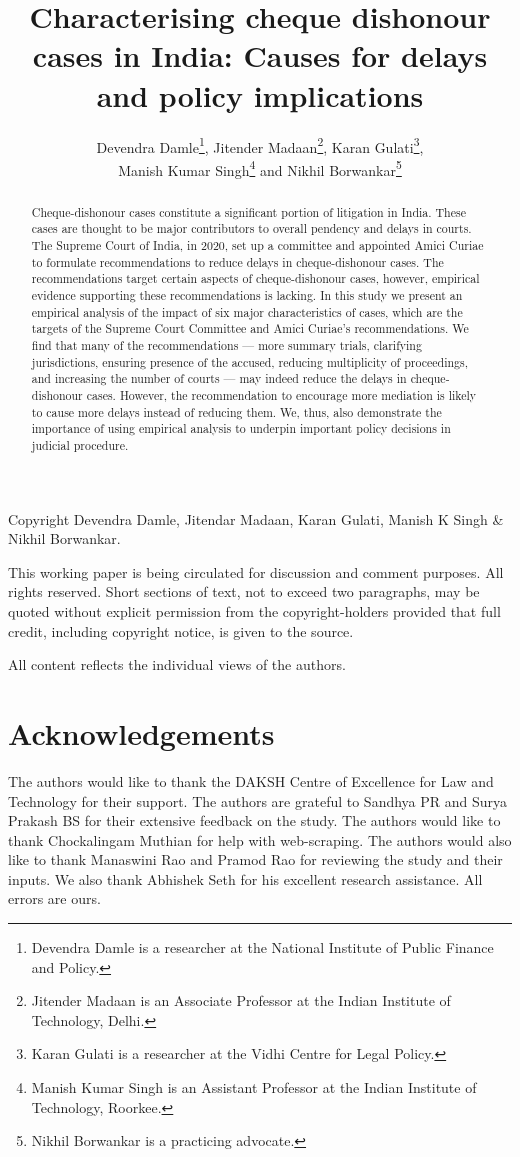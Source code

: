 \documentclass[12pt,a4paper]{article}
\title{Characterising cheque dishonour cases in India: Causes for delays and policy implications}
\author{Devendra Damle\thanks{Devendra Damle is a researcher at the National Institute of Public Finance and Policy.}, Jitender Madaan\thanks{Jitender Madaan is an Associate Professor at the Indian Institute of Technology, Delhi.}, Karan Gulati\thanks{Karan Gulati is a researcher at the Vidhi Centre for Legal Policy.},\\ Manish Kumar Singh\thanks{Manish Kumar Singh is an Assistant Professor at the Indian Institute of Technology, Roorkee.} and Nikhil Borwankar\thanks{Nikhil Borwankar is a practicing advocate.}}
\begin{document}
\maketitle

\begin{abstract}
Cheque-dishonour cases constitute a significant portion of litigation in India. These cases are thought to be major contributors to overall pendency and delays in courts. The Supreme Court of India, in 2020, set up a committee and appointed Amici Curiae to formulate recommendations to reduce delays in cheque-dishonour cases. The recommendations target certain aspects of cheque-dishonour cases, however, empirical evidence supporting these recommendations is lacking. In this study we present an empirical analysis of the impact of six major characteristics of cases, which are the targets of the Supreme Court Committee and Amici Curiae's recommendations. We find that many of the recommendations --- more summary trials, clarifying jurisdictions, ensuring presence of the accused, reducing multiplicity of proceedings, and increasing the number of courts --- may indeed reduce the delays in cheque-dishonour cases. However, the recommendation to encourage more mediation is likely to cause more delays instead of reducing them. We, thus, also demonstrate the importance of using empirical analysis to underpin important policy decisions in judicial procedure.
\end{abstract}

\newpage

Copyright Devendra Damle, Jitendar Madaan, Karan Gulati, Manish K Singh \& Nikhil Borwankar.

This working paper is being circulated for discussion and comment purposes. All rights reserved. Short sections of text, not to exceed two paragraphs, may be quoted without explicit permission from the copyright-holders provided that full credit, including copyright notice, is given to the source.

All content reflects the individual views of the authors.
\newpage

\section*{Acknowledgements}
The authors would like to thank the DAKSH Centre of Excellence for Law and Technology for their support. The authors are grateful to Sandhya PR and Surya Prakash BS for their extensive feedback on the study. The authors would like to thank Chockalingam Muthian for help with web-scraping. The authors would also like to thank Manaswini Rao and Pramod Rao for reviewing the study and their inputs. We also thank Abhishek Seth for his excellent research assistance. All errors are ours.
\end{document}
